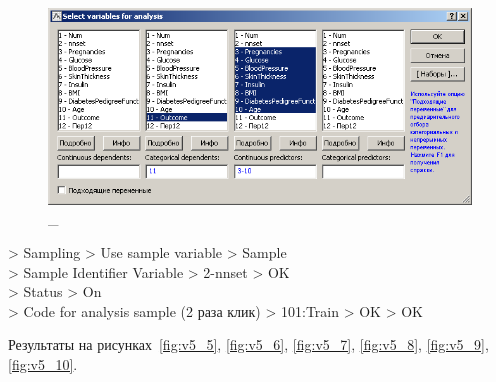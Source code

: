 \begin{figure}[!h]
  \centering

  \includegraphics[width=12cm]
  {inc/v5_4.PNG}

  \caption{\_}

  \label{fig:v5_4}
\end{figure}

> Sampling > Use sample variable > Sample \\
> Sample Identifier Variable > 2-nnset > OK \\
> Status > On \\
> Code for analysis sample (2 раза клик) > 101:Train > OK > OK

Результаты на рисунках~\ref{fig:v5_5}, \ref{fig:v5_6}, \ref{fig:v5_7},
\ref{fig:v5_8}, \ref{fig:v5_9}, \ref{fig:v5_10}.

